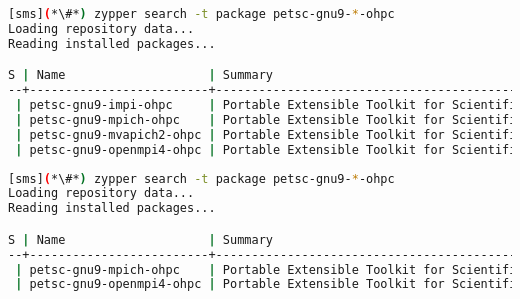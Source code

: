 \begin{lstlisting}[language=bash,keepspaces=true,keywords={}]
[sms](*\#*) zypper search -t package petsc-gnu9-*-ohpc
Loading repository data...
Reading installed packages...

S | Name                    | Summary
--+-------------------------+--------------------------------------------------------+--------
 | petsc-gnu9-impi-ohpc     | Portable Extensible Toolkit for Scientific Computation | package
 | petsc-gnu9-mpich-ohpc    | Portable Extensible Toolkit for Scientific Computation | package
 | petsc-gnu9-mvapich2-ohpc | Portable Extensible Toolkit for Scientific Computation | package
 | petsc-gnu9-openmpi4-ohpc | Portable Extensible Toolkit for Scientific Computation | package
\end{lstlisting}
\fi

\begin{lstlisting}[language=bash,keepspaces=true,keywords={}]
[sms](*\#*) zypper search -t package petsc-gnu9-*-ohpc
Loading repository data...
Reading installed packages...

S | Name                    | Summary
--+-------------------------+--------------------------------------------------------+--------
 | petsc-gnu9-mpich-ohpc    | Portable Extensible Toolkit for Scientific Computation | package
 | petsc-gnu9-openmpi4-ohpc | Portable Extensible Toolkit for Scientific Computation | package
\end{lstlisting}
\fi


